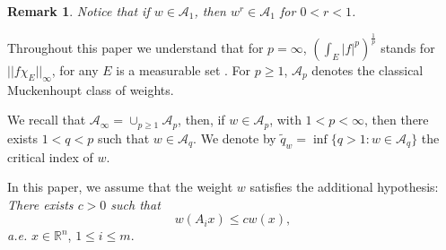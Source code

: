 \documentclass[a4paper,12pt,reqno]{amsart}
\numberwithin{equation}{section}
\newtheorem{remark}[theorem]{Remark}
\begin{document}
	\begin{remark}\label{Remark A1}
		Notice that if $w \in \mathcal{A}_1$, then $w^{r} \in \mathcal{A}_1$ for $0<r<1$.
	\end{remark}
	
	
	
	Throughout this paper we understand that for $p=\infty$,  $(\int_E|f|^p)^{\frac 1p}$ stands for  $||f\chi_E||_\infty$, for any $E$ is a measurable set .
	For $p\geq 1 $, $\mathcal{A}_p$ denotes the classical Muckenhoupt class of weights. 
	
	We recall that  $ \mathcal{A}_\infty=\cup_{p\geq 1} \mathcal{A}_p$, then, if $w \in \mathcal{A}_p$, with $1 < p < \infty$, then there exists $1<q<p$ such that $w \in \mathcal{A}_q$. We denote by $\tilde{q}_w=\inf\{q>1 : w \in \mathcal{A}_q\}$ the critical index of $w$. %
	
	\bigskip
	
	In this paper, we assume that the weight $w$ satisfies the additional hypothesis: \noindent \emph{There exists $c>0$  such that}
	\begin{equation}\label{hipotesis w}
		w(A_ix)\leq cw(x),
	\end{equation}
	\emph{  a.e.} $x\in\mathbb{R} ^n $, $1\leq i\leq m$.
	
\end{document}
